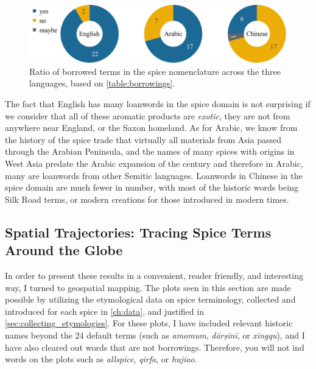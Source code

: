 \begin{figure}[ht!]
  \includegraphics[width=\linewidth]{imgs/plots/borrowing_pie.pdf}
  \caption[{Ratio of borrowed and not borrowed terms in the spice nomenclature.}]{Ratio of borrowed terms in the spice nomenclature across the three languages, based on \cref{table:borrowings}.}
  \label{fig:borrowing_pie}
\end{figure}

The fact that English has many loanwords in the spice domain is not surprising if we consider that all of these aromatic products are \emph{exotic}, they are not from anywhere near England, or the Saxon homeland. As for Arabic, we know from the history of the spice trade that virtually all materials from Asia passed through the Arabian Peninsula, and the names of many spices with origins in West Asia predate the Arabic expansion of the  century and therefore in Arabic, many are loanwords from other Semitic languages. Loanwords in Chinese in the spice domain are much fewer in number, with most of the historic words being Silk Road terms, or modern creations for those introduced in modern times. 



\subsection{Spatial Trajectories: Tracing Spice Terms Around the Globe}

In order to present these results in a convenient, reader friendly, and interesting way, I turned to geospatial mapping. The plots seen in this section are made possible by utilizing the etymological data on spice terminology, collected and introduced for each spice in \cref{ch:data}, and justified in \cref{sec:collecting_etymologies}. For these plots, I have included relevant historic names beyond the 24 default terms (such as \textit{amomum}, \textit{dārṣīnī}, or \textit{xingqu}), and I have also cleared out words that are not borrowings. Therefore, you will not ind words on the plots such as \textit{allspice}, \textit{qirfa}, or \textit{hujiao}.



